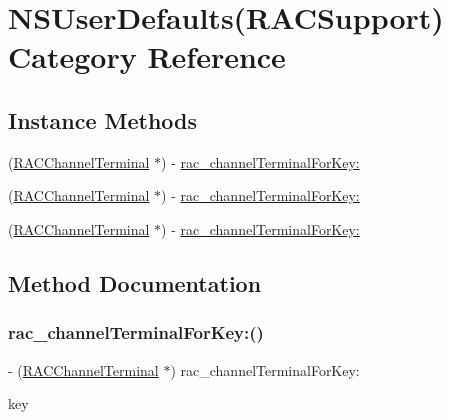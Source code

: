 \hypertarget{category_n_s_user_defaults_07_r_a_c_support_08}{}\section{N\+S\+User\+Defaults(R\+A\+C\+Support) Category Reference}
\label{category_n_s_user_defaults_07_r_a_c_support_08}
\subsection*{Instance Methods}
\begin{DoxyCompactItemize}
\item 
(\mbox{\hyperlink{interface_r_a_c_channel_terminal}{R\+A\+C\+Channel\+Terminal}} $\ast$) -\/ \mbox{\hyperlink{category_n_s_user_defaults_07_r_a_c_support_08_a7a8d6f1a01e63adb036a2841884ae4b5}{rac\+\_\+channel\+Terminal\+For\+Key\+:}}
\item 
(\mbox{\hyperlink{interface_r_a_c_channel_terminal}{R\+A\+C\+Channel\+Terminal}} $\ast$) -\/ \mbox{\hyperlink{category_n_s_user_defaults_07_r_a_c_support_08_a7a8d6f1a01e63adb036a2841884ae4b5}{rac\+\_\+channel\+Terminal\+For\+Key\+:}}
\item 
(\mbox{\hyperlink{interface_r_a_c_channel_terminal}{R\+A\+C\+Channel\+Terminal}} $\ast$) -\/ \mbox{\hyperlink{category_n_s_user_defaults_07_r_a_c_support_08_a7a8d6f1a01e63adb036a2841884ae4b5}{rac\+\_\+channel\+Terminal\+For\+Key\+:}}
\end{DoxyCompactItemize}


\subsection{Method Documentation}
\mbox{\label{category_n_s_user_defaults_07_r_a_c_support_08_a7a8d6f1a01e63adb036a2841884ae4b5}} 
\subsubsection{\texorpdfstring{rac\+\_\+channel\+Terminal\+For\+Key\+:()}{rac\_channelTerminalForKey:()}\hspace{0.1cm}{\footnotesize\ttfamily [1/3]}}
{\footnotesize\ttfamily -\/ (\mbox{\hyperlink{interface_r_a_c_channel_terminal}{R\+A\+C\+Channel\+Terminal}} $\ast$) rac\+\_\+channel\+Terminal\+For\+Key\+: \begin{DoxyParamCaption}\item[{(N\+S\+String $\ast$)}]{key }\end{DoxyParamCaption}}

